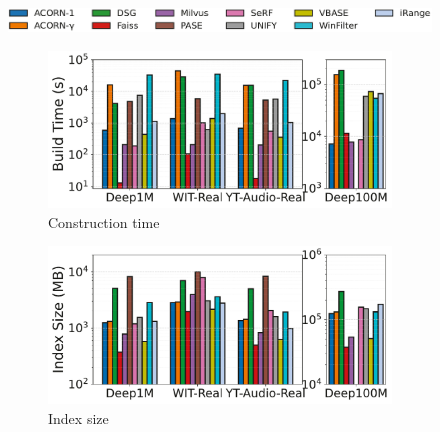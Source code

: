 \documentclass[sigconf, nonacm]{acmart}
\begin{document}
	\begin{figure}[t]
		\centering
		
		
		\hspace*{5pt}
		\includegraphics[width=0.98\columnwidth]{figures/indexData/rangeFilter_legend_only.pdf}
		
		
		\begin{subfigure}[t]{0.495\columnwidth}
			\centering
			\captionsetup{font=small}
			\includegraphics[width=\linewidth]{figures/indexData/rangeFilter_build_time_comparison_query.pdf}
			\caption{\footnotesize Construction time}
			\label{fig:rangeFilter_build_time}
		\end{subfigure}
		\hfill
		\begin{subfigure}[t]{0.495\columnwidth}
			\centering
			\includegraphics[width=\linewidth]{figures/indexData/rangeFilter_index_size_mb_comparison_query.pdf}
			\caption{\footnotesize Index size}
			\label{fig:rangeFilter_index_size_mb}
		\end{subfigure}
		\hfill
		\begin{subfigure}[t]{0.495\columnwidth}
			\centering

\end{subfigure}
\end{figure}
\end{document}
